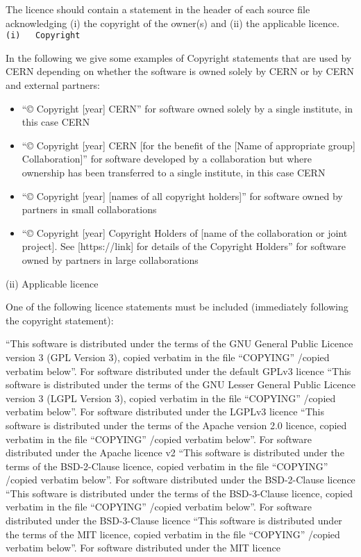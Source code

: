 \documentclass[12pt,a4paper]{article}
\begin{document}
The licence should contain a statement in the header of each source file acknowledging (i) the copyright of the owner(s) and (ii) the applicable licence.
\newline\verb?(i)	Copyright?

In the following we give some examples of Copyright statements that are used by CERN depending on whether the software is owned solely by CERN or by CERN and external partners:
\begin{itemize}
\item “© Copyright [year] CERN”
for software owned solely by a single institute, in this case CERN
\item “© Copyright [year] CERN [for the benefit of the [Name of appropriate group] Collaboration]”
for software developed by a collaboration but where ownership has been transferred to a single institute, in this case CERN
\item  “© Copyright [year] [names of all copyright holders]”
for software owned by partners in small collaborations
\item “© Copyright [year] Copyright Holders of [name of the collaboration or joint project]. See [https://link] for details of the Copyright Holders”
for software owned by partners in large collaborations
\end{itemize}

(ii)	Applicable licence

One of the following licence statements must be included (immediately following the copyright statement):

“This software is distributed under the terms of the GNU General Public Licence version 3 (GPL Version 3), copied verbatim in the file “COPYING” /copied verbatim below”.
For software distributed under the default GPLv3 licence
“This software is distributed under the terms of the GNU Lesser General Public Licence version 3 (LGPL Version 3), copied verbatim in the file “COPYING” /copied verbatim below”.
For software distributed under the LGPLv3 licence
“This software is distributed under the terms of the Apache version 2.0 licence, copied verbatim in the file “COPYING” /copied verbatim below”.
For software distributed under the Apache licence v2
“This software is distributed under the terms of the BSD-2-Clause licence, copied verbatim in the file “COPYING” /copied verbatim below”.
For software distributed under the BSD-2-Clause licence
“This software is distributed under the terms of the BSD-3-Clause licence, copied verbatim in the file “COPYING” /copied verbatim below”.
For software distributed under the BSD-3-Clause licence
“This software is distributed under the terms of the MIT licence, copied verbatim in the file “COPYING” /copied verbatim below”.
For software distributed under the MIT licence
\end{document}
